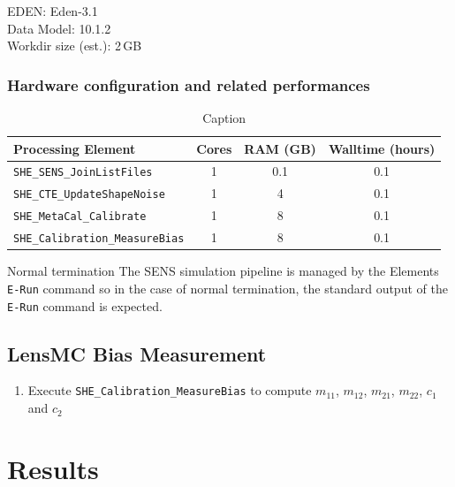 \documentclass[11pt]{EuclidVIS}
\numberwithin{table}{section}
\numberwithin{figure}{section}
\begin{document}
\noindent EDEN: Eden-3.1\\
\noindent Data Model: 10.1.2\\
\noindent Workdir size (est.): 2\,GB

\subsubsection{Hardware configuration and related performances}

\begin{table}[]
    \centering
    \begin{tabular}{|l|c|c|c|}
         \hline
         Processing Element                     & Cores & RAM (GB) & Walltime (hours) \\
         \hline
         \texttt{SHE\_SENS\_JoinListFiles}      & 1     & 0.1      & 0.1 \\
         \texttt{SHE\_CTE\_UpdateShapeNoise}    & 1     & 4        & 0.1 \\
         \texttt{SHE\_MetaCal\_Calibrate}       & 1     & 8        & 0.1 \\
         \texttt{SHE\_Calibration\_MeasureBias} & 1     & 8        & 0.1 \\
         
         \hline
    \end{tabular}
    \caption{Caption}
    \label{tab:my_label}
\end{table}

\noindent Normal termination
The SENS simulation pipeline is managed by the Elements \texttt{E-Run} command so in the case of normal termination, the standard output of the \texttt{E-Run} command is expected.










\subsection{LensMC Bias Measurement}
\begin{enumerate}
    \item Execute \texttt{SHE\_Calibration\_MeasureBias} to compute $m_{11}$, $m_{12}$, $m_{21}$,
    $m_{22}$, $c_{1}$ and $c_{2}$
\end{enumerate}



\section{Results}
\label{sec:results}
\end{document}
